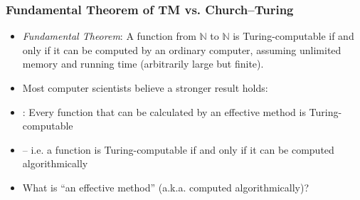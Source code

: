 \begin{frame}
\frametitle{Fundamental Theorem of TM vs. Church--Turing}

\begin{itemize}[<+->]

\item \emph{Fundamental Theorem}: A function from $\mathbb{N}$ to $\mathbb{N}$ is Turing-computable if and only if it can be computed by an ordinary computer, assuming unlimited memory and running time (arbitrarily large but finite).

\item Most computer scientists believe a stronger result holds:

\item {}: Every function that can be calculated by an effective method is Turing-computable

\item[]  -- i.e. a function is Turing-computable if and only if it can be computed algorithmically


\item What is ``an effective method'' (a.k.a. computed algorithmically)?


\end{itemize}
\end{frame}

